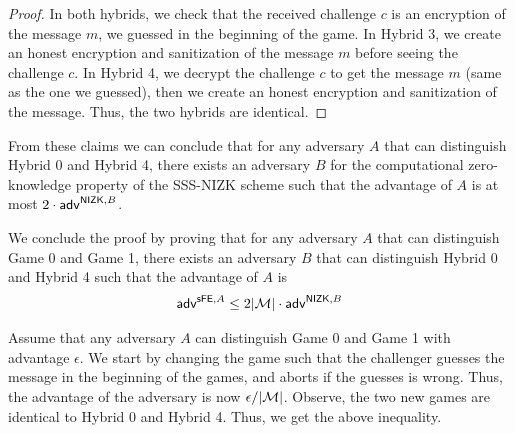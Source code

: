 \documentclass{llncs}
\begin{document}
\begin{proof} 
In both hybrids, we check that the received challenge $c$ is an encryption of the message $m$, we guessed in the beginning of the game. 
In Hybrid 3, we create an honest encryption and sanitization of the message $m$ before seeing the challenge $c$. 
In Hybrid 4, we decrypt the challenge $c$ to get the message $m$ (same as the one we guessed), then we create an honest encryption and sanitization of the message. 
Thus, the two hybrids are identical. 
\end{proof}

From these claims we can conclude that for any adversary $A$ that can distinguish Hybrid 0 and Hybrid 4, there exists an adversary $B$ for the computational zero-knowledge property of the SSS-NIZK scheme such that the advantage of $A$ is at most $2 \cdot\mathsf{adv}^{\mathsf{NIZK},B}$.

We conclude the proof by proving that for any adversary $A$ that can distinguish Game 0 and Game 1, there exists an adversary $B$ that can distinguish Hybrid 0 and Hybrid 4 such that the advantage of $A$ is
	\begin{align*}
	\mathsf{adv}^{\mathsf{sFE},A} \leq 2|\mathcal{M}| \cdot\mathsf{adv}^{\mathsf{NIZK},B} 
	\end{align*}

Assume that any adversary $A$ can distinguish Game 0 and Game 1 with advantage $\epsilon$. 
We start by changing the game such that the challenger guesses the message in the beginning of the games, and aborts if the guesses is wrong. Thus, the advantage of the adversary is now $\epsilon/|\mathcal{M}|$.
Observe, the two new games are identical to Hybrid 0 and Hybrid 4. Thus, we get the above inequality.
\end{document}
